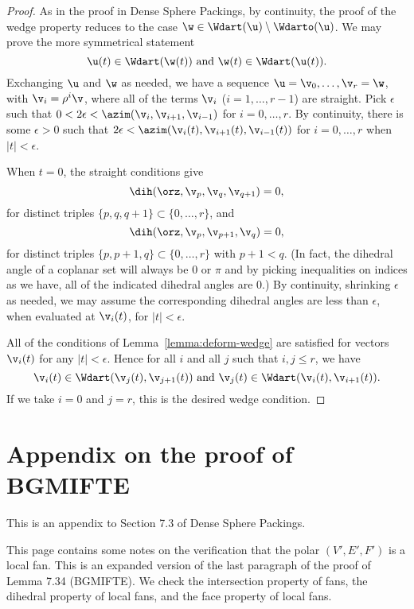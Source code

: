 \begin{proof}
As in the proof in Dense Sphere Packings,  by continuity,
the proof of the wedge property reduces to the case $\w\in \Wdart(\u)\setminus \Wdarto(\u)$.
We may prove the more symmetrical statement
\[
\u(t)\in \Wdart(\w(t)) \text{ and } \w(t) \in \Wdart(\u(t)).
\]
Exchanging $\u$ and $\w$ as needed, 
we have a sequence $\u=\v_0,\ldots,\v_r =\w$, with $\v_i =\rho^i\v$,
where all of the terms $\v_i$ ($i=1,\ldots,r-1$) are straight.
Pick $\epsilon$ such that  $0 < 2\epsilon < \azim(\v_i,\v_{i+1},\v_{i-1})$ for $i=0,\ldots,r$.
By continuity, there is some $\epsilon > 0$ such that
$2\epsilon < \azim(\v_i(t),\v_{i+1}(t),\v_{i-1}(t))$ for $i=0,\ldots,r$ when $|t|<\epsilon$.

When $t=0$, the straight conditions give
\[
\dih(\orz,\v_p,\v_q,\v_{q+1}) = 0,
\]
for distinct triples $\{p,q,q+1\} \subset \{0,\ldots,r\}$,
and
\[
\dih(\orz,\v_p,\v_{p+1},\v_q)=0,
\]
for distinct triples $\{p,p+1,q\}\subset \{0,\ldots,r\}$ with $p+1 < q$.
(In fact, the dihedral angle of a coplanar set will always be $0$ or $\pi$ and by picking
inequalities on indices as we have, all of the indicated dihedral angles are $0$.)
By continuity, shrinking $\epsilon$ as needed, we may assume the corresponding
dihedral angles are less than $\epsilon$, when evaluated at $\v_i(t)$, for $|t|<\epsilon$.

All of the conditions of Lemma~\ref{lemma:deform-wedge} are satisfied for
vectors $\v_i(t)$ for any $|t|<\epsilon$.  Hence for all $i$ and all $j$ such that $i,j\le r$, we have
\[
\v_i(t) \in \Wdart(\v_{j}(t),\v_{j+1}(t)) \text{ and } \v_j(t) \in \Wdart(\v_{i}(t),\v_{i+1}(t)).
\]
If we take $i=0$ and $j=r$, this is the desired wedge condition.
\end{proof}





\newpage
\section{Appendix on the proof of BGMIFTE}

This is an appendix to Section 7.3 of Dense Sphere Packings.

This page contains some notes on the verification that the polar $(V',E',F')$ is
a local fan.   This is an expanded version of  the last paragraph
of the proof of Lemma 7.34 (BGMIFTE).
We check the intersection property of fans, the dihedral property
of local fans, and the face property of local fans.

